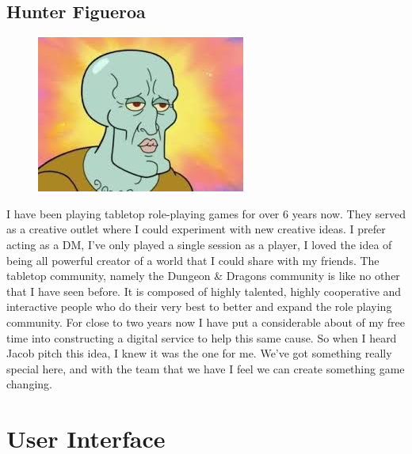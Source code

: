 \documentclass[12pt,a4paper]{report}
\begin{document}
	\newpage
	\section{Hunter Figueroa}
	\begin{figure}
		\includegraphics[scale=0.05]{Hunter_Figueroa}
	\end{figure}
	I have been playing tabletop role-playing games for over 6 years now. They served as a creative outlet where I could experiment with new creative ideas. I prefer acting as a DM, I’ve only played a single session as a player, I loved the idea of being all powerful creator of a world that I could share with my friends. The tabletop community, namely the Dungeon \& Dragons community is like no other that I have seen before. It is composed of highly talented, highly cooperative  and interactive people who do their very best to better and expand the role playing community. For close to two years now I have put a considerable about of my free time into constructing a digital service to help this same cause. So when I heard Jacob pitch this idea, I knew it was the one for me. We’ve got something really special here, and with the team that we have I feel we can create something game changing.
	
\newpage
\chapter*{User Interface}
\end{document}
